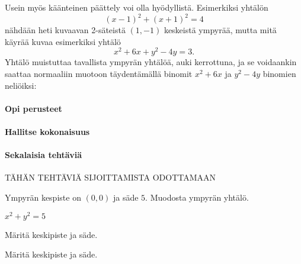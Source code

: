 Usein myös käänteinen päättely voi olla hyödyllistä. Esimerkiksi yhtälön
\[
(x-1)^2+(x+1)^2=4
\]
nähdään heti kuvaavan 2-säteistä $(1,-1)$ keskeistä ympyrää, mutta mitä käyrää kuvaa esimerkiksi yhtälö
\[
x^2+6x+y^2-4y=3.
\]
Yhtälö muistuttaa tavallista ympyrän yhtälöä, auki kerrottuna, ja se voidaankin saattaa normaaliin muotoon täydentämällä binomit $x^2+6x$ ja $y^2-4y$ binomien neliöiksi:







\begin{tehtavasivu}

\paragraph*{Opi perusteet}

\paragraph*{Hallitse kokonaisuus}

\paragraph*{Sekalaisia tehtäviä}

TÄHÄN TEHTÄVIÄ SIJOITTAMISTA ODOTTAMAAN

\begin{tehtava}
Ympyrän kespiste on $(0,0)$ ja säde $5$. Muodosta ympyrän yhtälö.
\begin{vastaus}
$x^2+y^2=5$
\end{vastaus}
\end{tehtava}

\begin{tehtava}
Märitä keskipiste ja säde.
\begin{alakohdat}
\end{alakohdat}
\begin{vastaus}
\begin{alakohdat}
\end{alakohdat}
\end{vastaus}
\end{tehtava}

\begin{tehtava}
Märitä keskipiste ja säde.
\begin{alakohdat}
\end{alakohdat}
\begin{vastaus}
\begin{alakohdat}
\end{alakohdat}
\end{vastaus}
\end{tehtava}


\end{tehtavasivu}
